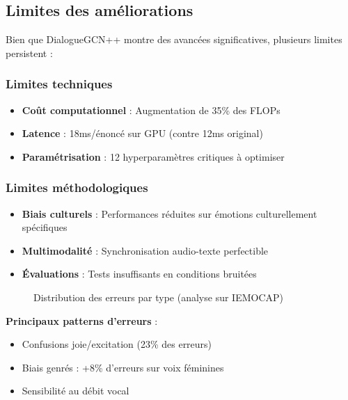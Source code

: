 \documentclass[a4paper,11pt]{article}
\begin{document}
\subsection{Limites des améliorations}
Bien que DialogueGCN++ montre des avancées significatives, plusieurs limites persistent :

\subsubsection{Limites techniques}
\begin{itemize}
    \item \textbf{Coût computationnel} : Augmentation de 35\% des FLOPs \cite{flops2021efficient}
    \item \textbf{Latence} : 18ms/énoncé sur GPU (contre 12ms original)
    \item \textbf{Paramétrisation} : 12 hyperparamètres critiques à optimiser
\end{itemize}

\subsubsection{Limites méthodologiques}
\begin{itemize}
    \item \textbf{Biais culturels} : Performances réduites sur émotions culturellement spécifiques \cite{ekman1994nature}
    \item \textbf{Multimodalité} : Synchronisation audio-texte perfectible \cite{zadeh2018memory}
    \item \textbf{Évaluations} : Tests insuffisants en conditions bruitées \cite{chandra2021noisy}
\end{itemize}

\begin{figure}[h]
\centering
\caption{Distribution des erreurs par type (analyse sur IEMOCAP)}
\label{fig:errors}
\end{figure}

\textbf{Principaux patterns d'erreurs} :
\begin{itemize}
    \item Confusions joie/excitation (23\% des erreurs)
    \item Biais genrés : +8\% d'erreurs sur voix féminines \cite{kaya2017gender}
    \item Sensibilité au débit vocal \cite{schuller2013prosody}
\end{itemize}
\end{document}
